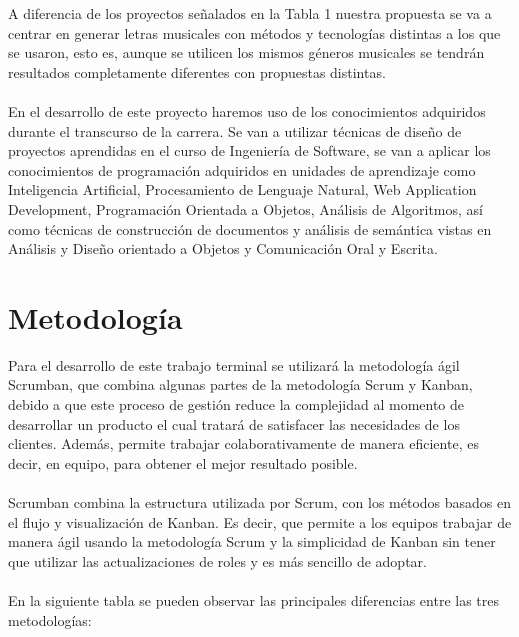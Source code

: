 \documentclass[12pt, a4paper, titlepage]{report}
\begin{document}
    	A diferencia de los proyectos señalados en la Tabla 1 nuestra propuesta se va a centrar en generar letras musicales con métodos y tecnologías distintas a los que se usaron, esto es, aunque se utilicen los mismos géneros musicales se tendrán resultados completamente diferentes con propuestas distintas.\\\\
    	En el desarrollo de este proyecto haremos uso de los conocimientos adquiridos durante el transcurso de la carrera. Se van a utilizar técnicas de diseño de proyectos aprendidas en el curso de Ingeniería de Software, se van a aplicar los conocimientos de programación adquiridos en unidades de aprendizaje como Inteligencia Artificial, Procesamiento de Lenguaje Natural, Web Application Development, Programación Orientada a Objetos, Análisis de Algoritmos, así como técnicas de construcción de documentos y análisis de semántica vistas en Análisis y Diseño orientado a Objetos y Comunicación Oral y Escrita.
    	
	    \section{Metodolog\'ia}
	    Para el desarrollo de este trabajo terminal se utilizará la metodología ágil Scrumban, que combina algunas partes de la metodología Scrum y Kanban, debido a que este proceso de gestión reduce la complejidad al momento de desarrollar un producto el cual tratará de satisfacer las necesidades de los clientes. Además, permite trabajar colaborativamente de manera eficiente, es decir, en equipo, para obtener el mejor resultado posible.\\\\
	    Scrumban combina la estructura utilizada por Scrum, con los métodos basados en el flujo y visualización de Kanban. Es decir, que permite a los equipos trabajar de manera ágil usando la metodología Scrum y la simplicidad de Kanban sin tener que utilizar las actualizaciones de roles y es más sencillo de adoptar.\\\\
	    En la siguiente tabla se pueden observar las principales diferencias entre las tres metodologías:
    
\end{document}
